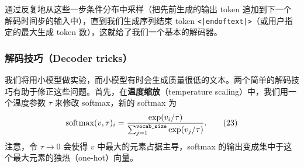 通过反复地从这些一步条件分布中采样（把先前生成的输出 token 追加到下一个解码时间步的输入中），直到我们生成序列结束 token \texttt{<|endoftext|>}（或用户指定的最大生成 token 数），这就给了我们一个基本的解码器。

\subsubsection*{解码技巧（Decoder tricks）}

我们将用小模型做实验，而小模型有时会生成质量很低的文本。两个简单的解码技巧有助于修正这些问题。首先，在\textbf{温度缩放}（temperature scaling）中，我们用一个温度参数 $\tau$ 来修改 softmax，新的 softmax 为
\begin{equation*}
\operatorname{softmax}(v, \tau)_i = \frac{\exp(v_i / \tau)}{\sum_{j=1}^{\texttt{vocab\_size}} \exp(v_j / \tau)}. \tag{23}
\end{equation*}
注意，令 $\tau \to 0$ 会使得 $v$ 中最大的元素占据主导，softmax 的输出变成集中于这个最大元素的独热（one-hot）向量。
